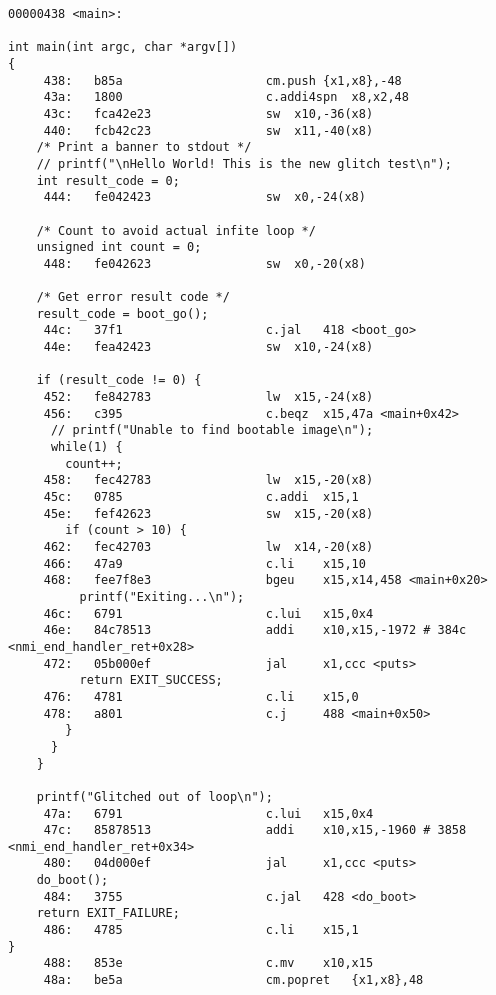 \begin{lstlisting}[caption={Assembly code for instruction skip test program}, label=lst:asm_instr_skip, language=riscv]
00000438 <main>:

int main(int argc, char *argv[])
{
     438:	b85a                    cm.push {x1,x8},-48
     43a:	1800                    c.addi4spn	x8,x2,48
     43c:	fca42e23                sw	x10,-36(x8)
     440:	fcb42c23                sw	x11,-40(x8)
    /* Print a banner to stdout */
    // printf("\nHello World! This is the new glitch test\n");
    int result_code = 0;
     444:	fe042423                sw	x0,-24(x8)

    /* Count to avoid actual infite loop */
    unsigned int count = 0;
     448:	fe042623                sw	x0,-20(x8)

    /* Get error result code */
    result_code = boot_go();
     44c:	37f1                    c.jal   418 <boot_go>
     44e:	fea42423                sw	x10,-24(x8)

    if (result_code != 0) {
     452:	fe842783                lw	x15,-24(x8)
     456:	c395                    c.beqz  x15,47a <main+0x42>
      // printf("Unable to find bootable image\n");
      while(1) {
        count++;
     458:	fec42783                lw	x15,-20(x8)
     45c:	0785                    c.addi  x15,1
     45e:	fef42623                sw	x15,-20(x8)
        if (count > 10) {
     462:	fec42703                lw	x14,-20(x8)
     466:	47a9                    c.li    x15,10
     468:	fee7f8e3                bgeu    x15,x14,458 <main+0x20>
          printf("Exiting...\n");
     46c:	6791                    c.lui   x15,0x4
     46e:	84c78513                addi    x10,x15,-1972 # 384c <nmi_end_handler_ret+0x28>
     472:	05b000ef                jal     x1,ccc <puts>
          return EXIT_SUCCESS;
     476:	4781                    c.li    x15,0
     478:	a801                    c.j     488 <main+0x50>
        }
      }
    }

    printf("Glitched out of loop\n");
     47a:	6791                    c.lui   x15,0x4
     47c:	85878513                addi    x10,x15,-1960 # 3858 <nmi_end_handler_ret+0x34>
     480:	04d000ef                jal     x1,ccc <puts>
    do_boot();
     484:	3755                    c.jal   428 <do_boot>
    return EXIT_FAILURE;
     486:	4785                    c.li    x15,1
}
     488:	853e                    c.mv    x10,x15
     48a:	be5a                    cm.popret	{x1,x8},48

\end{lstlisting}

